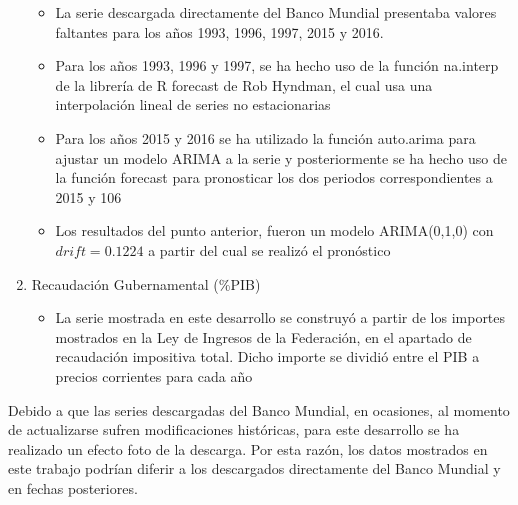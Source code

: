\begin{enumerate}
\begin{itemize}
				\item La serie descargada directamente del Banco Mundial presentaba valores faltantes para los años 1993, 1996, 1997, 2015 y 2016. 
				\item Para los años 1993, 1996 y 1997, se ha hecho uso de la función na.interp de la librería de R forecast de Rob Hyndman, el cual usa una interpolación lineal de series no estacionarias
				\item Para los años 2015 y 2016 se ha utilizado la función auto.arima para ajustar un modelo ARIMA a la serie y posteriormente se ha hecho uso de la función forecast para pronosticar los dos periodos 							correspondientes a 2015 y 106
				\item Los resultados del punto anterior, fueron un modelo ARIMA(0,1,0) con $drift=0.1224$ a partir del cual se realizó el pronóstico
			\end{itemize}
	\item Recaudación Gubernamental (\%PIB)
	\begin{itemize}
				\item  La serie mostrada en este desarrollo se construyó a partir de los importes mostrados en la Ley de Ingresos de la Federación, en el apartado de recaudación impositiva total. Dicho importe se dividió entre el PIB a precios corrientes para cada año
			\end{itemize}			
\end{enumerate}


Debido a que las series descargadas del Banco Mundial, en ocasiones, al momento de actualizarse sufren modificaciones históricas, para este desarrollo se ha realizado un efecto foto de la descarga. Por esta razón, los datos mostrados en este trabajo podrían diferir a los descargados directamente del Banco Mundial y en fechas posteriores.